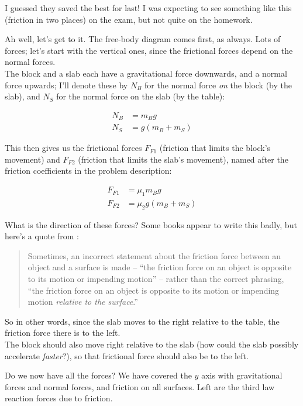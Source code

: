 \documentclass[12pt,a4paper]{report}
\begin{document}
I guessed they saved the best for last! I was expecting to see something like this (friction in two places) on the exam, but not quite on the homework.

Ah well, let's get to it. The free-body diagram comes first, as always. Lots of forces; let's start with the vertical ones, since the frictional forces depend on the normal forces.\\
The block and a slab each have a gravitational force downwards, and a normal force upwards; I'll denote these by $N_B$ for the normal force \emph{on} the block (by the slab), and $N_S$ for the normal force on the slab (by the table):

\begin{align}
N_B &= m_B g\\
N_S &= g(m_B + m_S)
\end{align}

This then gives us the frictional forces $F_{F1}$ (friction that limits the block's movement) and $F_{F2}$ (friction that limits the slab's movement), named after the friction coefficients in the problem description:

\begin{align}
F_{F1} &= \mu_1 m_B g\\
F_{F2} &= \mu_2 g(m_B + m_S)
\end{align}

What is the direction of these forces? Some books appear to write this badly, but here's a quote from \cite[p.~123]{serway}:

\begin{quote}
Sometimes, an incorrect statement about the friction force between an object and a surface is made -- ``the friction force on an object is opposite to its motion or impending motion'' -- rather than the correct phrasing, ``the friction force on an object is opposite to its motion or impending motion \emph{relative to the surface}.''
\end{quote}

So in other words, since the slab moves to the right relative to the table, the friction force there is to the left.\\
The block should also move right relative to the slab (how could the slab possibly accelerate \emph{faster}?), so that frictional force should also be to the left.

Do we now have all the forces? We have covered the $y$ axis with gravitational forces and normal forces, and friction on all surfaces. Left are the third law reaction forces due to friction.
\end{document}
